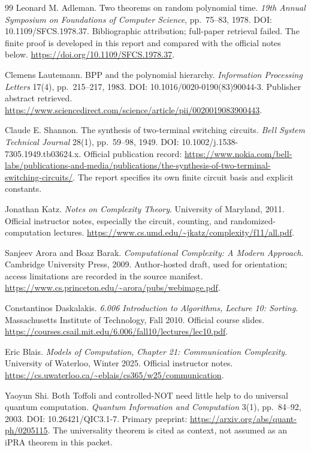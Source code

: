 \begin{thebibliography}{99}
Leonard M. Adleman. Two theorems on random polynomial time. \emph{19th Annual Symposium on Foundations of Computer Science}, pp.~75--83, 1978. DOI: 10.1109/SFCS.1978.37. Bibliographic attribution; full-paper retrieval failed. The finite proof is developed in this report and compared with the official notes below.
\url{https://doi.org/10.1109/SFCS.1978.37}.

Clemens Lautemann. BPP and the polynomial hierarchy. \emph{Information Processing Letters} 17(4), pp.~215--217, 1983. DOI: 10.1016/0020-0190(83)90044-3. Publisher abstract retrieved.
\url{https://www.sciencedirect.com/science/article/pii/0020019083900443}.

Claude E. Shannon. The synthesis of two-terminal switching circuits. \emph{Bell System Technical Journal} 28(1), pp.~59--98, 1949. DOI: 10.1002/j.1538-7305.1949.tb03624.x. Official publication record:
\url{https://www.nokia.com/bell-labs/publications-and-media/publications/the-synthesis-of-two-terminal-switching-circuits/}.
The report specifies its own finite circuit basis and explicit constants.

Jonathan Katz. \emph{Notes on Complexity Theory}. University of Maryland, 2011. Official instructor notes, especially the circuit, counting, and randomized-computation lectures.
\url{https://www.cs.umd.edu/~jkatz/complexity/f11/all.pdf}.

Sanjeev Arora and Boaz Barak. \emph{Computational Complexity: A Modern Approach}. Cambridge University Press, 2009. Author-hosted draft, used for orientation; access limitations are recorded in the source manifest.
\url{https://www.cs.princeton.edu/~arora/pubs/webimage.pdf}.

Constantinos Daskalakis. \emph{6.006 Introduction to Algorithms, Lecture 10: Sorting}. Massachusetts Institute of Technology, Fall 2010. Official course slides.
\url{https://courses.csail.mit.edu/6.006/fall10/lectures/lec10.pdf}.

Eric Blais. \emph{Models of Computation, Chapter 21: Communication Complexity}. University of Waterloo, Winter 2025. Official instructor notes.
\url{https://cs.uwaterloo.ca/~eblais/cs365/w25/communication}.

Yaoyun Shi. Both Toffoli and controlled-NOT need little help to do universal quantum computation. \emph{Quantum Information and Computation} 3(1), pp.~84--92, 2003. DOI: 10.26421/QIC3.1-7. Primary preprint:
\url{https://arxiv.org/abs/quant-ph/0205115}.
The universality theorem is cited as context, not assumed as an iPRA theorem in this packet.


\end{thebibliography}
